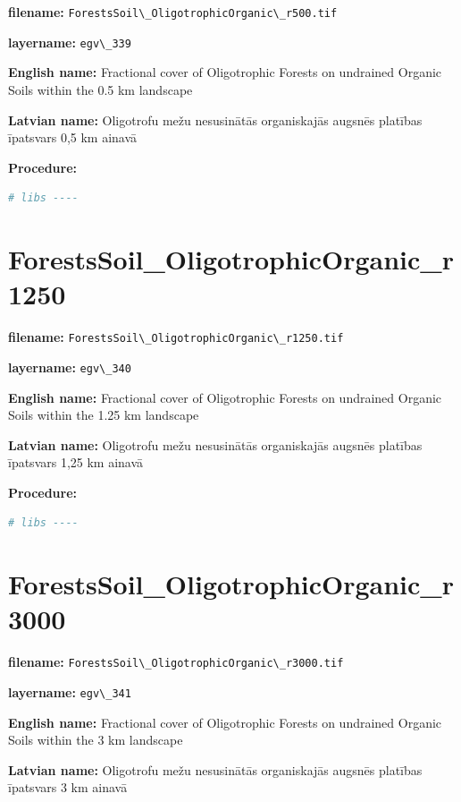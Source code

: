 \documentclass[
]{book}
\newcommand{\passthrough}[1]{#1}
\begin{document}
\textbf{filename:} \passthrough{\lstinline!ForestsSoil\_OligotrophicOrganic\_r500.tif!}

\textbf{layername:} \passthrough{\lstinline!egv\_339!}

\textbf{English name:} Fractional cover of Oligotrophic Forests on undrained Organic Soils within the 0.5 km landscape

\textbf{Latvian name:} Oligotrofu mežu nesusinātās organiskajās augsnēs platības īpatsvars 0,5 km ainavā

\textbf{Procedure:}

\begin{lstlisting}[language=R]
# libs ----
\end{lstlisting}

\section{ForestsSoil\_OligotrophicOrganic\_r1250}\label{ch06.340}

\textbf{filename:} \passthrough{\lstinline!ForestsSoil\_OligotrophicOrganic\_r1250.tif!}

\textbf{layername:} \passthrough{\lstinline!egv\_340!}

\textbf{English name:} Fractional cover of Oligotrophic Forests on undrained Organic Soils within the 1.25 km landscape

\textbf{Latvian name:} Oligotrofu mežu nesusinātās organiskajās augsnēs platības īpatsvars 1,25 km ainavā

\textbf{Procedure:}

\begin{lstlisting}[language=R]
# libs ----
\end{lstlisting}

\section{ForestsSoil\_OligotrophicOrganic\_r3000}\label{ch06.341}

\textbf{filename:} \passthrough{\lstinline!ForestsSoil\_OligotrophicOrganic\_r3000.tif!}

\textbf{layername:} \passthrough{\lstinline!egv\_341!}

\textbf{English name:} Fractional cover of Oligotrophic Forests on undrained Organic Soils within the 3 km landscape

\textbf{Latvian name:} Oligotrofu mežu nesusinātās organiskajās augsnēs platības īpatsvars 3 km ainavā
\end{document}
